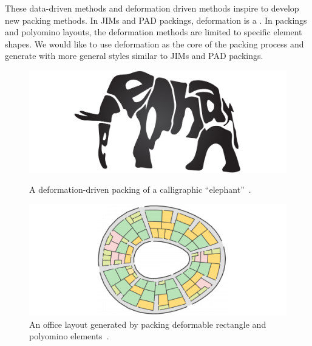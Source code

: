 \newtext
{
These data-driven methods and deformation driven methods inspire  to develop new packing methods.
In JIMs and PAD packings, deformation is a .
In  packings and polyomino layouts, the deformation methods are limited to specific element shapes.
We would like to use deformation as the core of the packing process and generate 
with more general styles similar to JIMs and PAD packings.
}




\begin{figure}
\centering
\includegraphics[width=1.0\textwidth]{figures/related/calligraphy.pdf} 
\caption[A calligraphy packing of an ``elephant'']
{\label{fig_calligraphy_packing} 
\newtext
{
A deformation-driven packing of a calligraphic ``elephant''~\cite{Xu2007}.
}
}
\vspace{20pt}
\includegraphics[width=1.0\textwidth]{figures/related/layout.pdf} 
\caption[An office layout generated by packing \newline deformable rectangle and polyomino elements]
{\label{fig_office}
\newtext
{
An office layout generated by packing deformable rectangle and polyomino elements~\cite{Peng2014}.
}
}
\end{figure}




